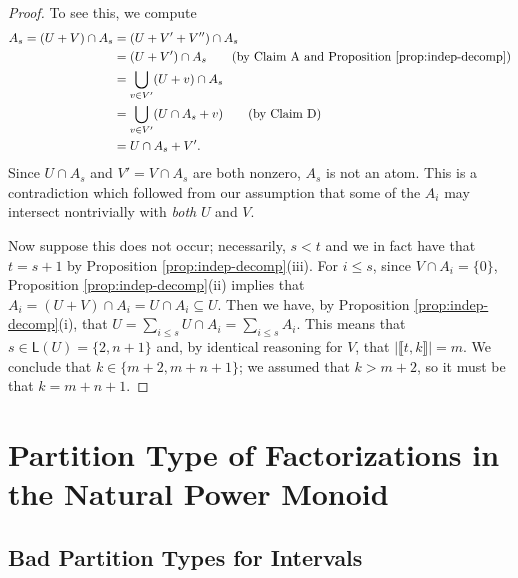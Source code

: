 \documentclass{report}
\newcommand{\NN}{\mathbb{N}}
\renewcommand{\P}{\mathcal{P}}
\newcommand{\llb}{\llbracket}
\newcommand{\rrb}{\rrbracket}
\newcommand{\fin}{\textrm{fin}}
\renewcommand{\:}{\text{:}}
\theoremstyle{definition}
\begin{document}
\begin{proof}
To see this, we compute
\begin{align*}
A_s = (U+V)\cap A_s 
&= (U+V'+V'') \cap A_s \\
&= (U+V') \cap A_s \tag{by Claim A and Proposition \ref{prop:indep-decomp}} \\
&= \bigcup_{v\in V'} (U+v)\cap A_s \\
&= \bigcup_{v\in V'} (U\cap A_s + v) \tag{by Claim D} \\
&= U\cap A_s + V'.
\end{align*}
Since $U\cap A_s$ and $V' = V\cap A_s$ are both nonzero, $A_s$ is not an atom.
This is a contradiction which followed from our assumption that some of the $A_i$ may intersect nontrivially with \textit{both} $U$ and $V$.

Now suppose this does not occur; necessarily, $s < t$ and we in fact have that $t = s+1$ by Proposition \ref{prop:indep-decomp}(iii).
For $i \le s$, since $V\cap A_i  = \{0\}$, Proposition \ref{prop:indep-decomp}(ii) implies that $A_i = (U+V)\cap A_i = U\cap A_i \subseteq U$.
Then we have, by Proposition \ref{prop:indep-decomp}(i), that $U = \sum_{i\le s} U\cap A_i = \sum_{i\le s} A_i$.
This means that $s\in \mathsf{L}(U) = \{2,n+1\}$ and, by identical reasoning for $V$, that $| \llb t,k \rrb| = m$.
We conclude that $k \in \{m+2,m+n+1\}$; we assumed that $k>m+2$, so it must be that $k = m+n+1$.
\end{proof}


\chapter{Partition Type of Factorizations in the Natural Power Monoid}
\section{Bad Partition Types for Intervals} \label{sec:partitions}


\end{document}
